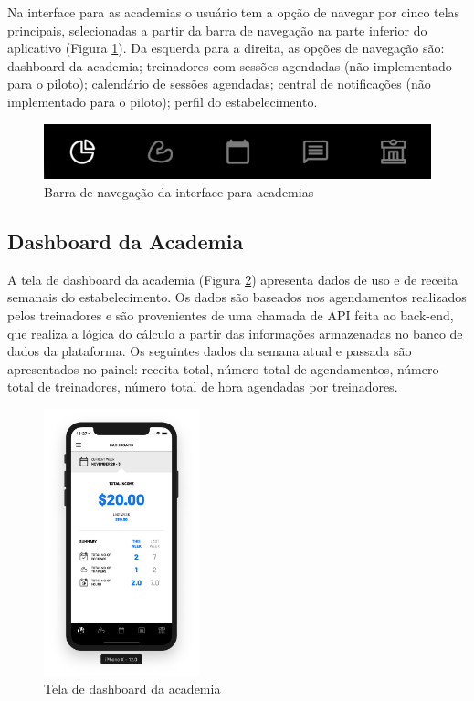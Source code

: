 Na interface para as academias o usuário tem a opção de navegar por cinco telas principais, selecionadas a partir da barra de navegação na parte inferior do aplicativo (Figura \ref{fig:gym-tabbar}). Da esquerda para a direita, as opções de navegação são: dashboard da academia; treinadores com sessões agendadas (não implementado para o piloto); calendário de sessões agendadas; central de notificações (não implementado para o piloto); perfil do estabelecimento.

\begin{figure}[h]
    \centering
    \includegraphics{pfc/figuras/gym-tabbar.png}
    \caption{Barra de navegação da interface para academias}
    \label{fig:gym-tabbar}
\end{figure}


\subsection{Dashboard da Academia}
A tela de dashboard da academia (Figura \ref{fig:gym-dashboard}) apresenta dados de uso e de receita semanais do estabelecimento. Os dados são baseados nos agendamentos realizados pelos treinadores e são provenientes de uma chamada de API feita ao back-end, que realiza a lógica do cálculo a partir das informações armazenadas no banco de dados da plataforma. Os seguintes dados da semana atual e passada são apresentados no painel: receita total, número total de agendamentos, número total de treinadores, número total de hora agendadas por treinadores.

\begin{figure}[H]
    \centering
    \includegraphics[width=0.4\textwidth]{pfc/figuras/gym-dashboard.png}
    \caption{Tela de dashboard da academia}
    \label{fig:gym-dashboard}
\end{figure}

